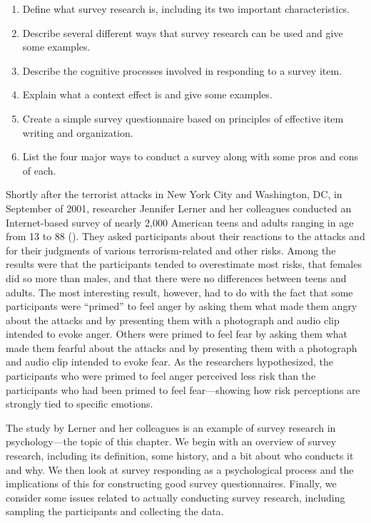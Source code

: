 \documentclass[
]{krantz}
\providecommand{\tightlist}{%
  \setlength{\itemsep}{0pt}\setlength{\parskip}{0pt}}
\begin{document}
\begin{enumerate}
\def\labelenumi{\arabic{enumi}.}
\tightlist
\item
  Define what survey research is, including its two important characteristics.
\item
  Describe several different ways that survey research can be used and give some examples.
\item
  Describe the cognitive processes involved in responding to a survey item.
\item
  Explain what a context effect is and give some examples.
\item
  Create a simple survey questionnaire based on principles of effective item writing and organization.
\item
  List the four major ways to conduct a survey along with some pros and cons of each.
\end{enumerate}

Shortly after the terrorist attacks in New York City and Washington, DC, in September of 2001, researcher Jennifer Lerner and her colleagues conducted an Internet-based survey of nearly 2,000 American teens and adults ranging in age from 13 to 88 (). They asked participants about their reactions to the attacks and for their judgments of various terrorism-related and other risks. Among the results were that the participants tended to overestimate most risks, that females did so more than males, and that there were no differences between teens and adults. The most interesting result, however, had to do with the fact that some participants were ``primed'' to feel anger by asking them what made them angry about the attacks and by presenting them with a photograph and audio clip intended to evoke anger. Others were primed to feel fear by asking them what made them fearful about the attacks and by presenting them with a photograph and audio clip intended to evoke fear. As the researchers hypothesized, the participants who were primed to feel anger perceived less risk than the participants who had been primed to feel fear---showing how risk perceptions are strongly tied to specific emotions.

The study by Lerner and her colleagues is an example of survey research in psychology---the topic of this chapter. We begin with an overview of survey research, including its definition, some history, and a bit about who conducts it and why. We then look at survey responding as a psychological process and the implications of this for constructing good survey questionnaires. Finally, we consider some issues related to actually conducting survey research, including sampling the participants and collecting the data.
\end{document}
